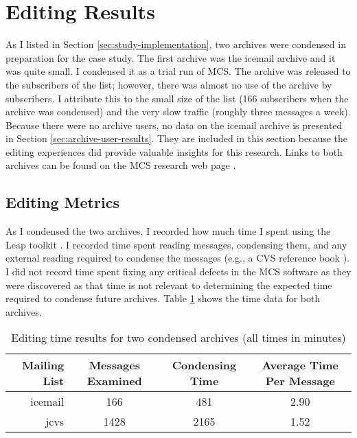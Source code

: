\section{Editing Results}
\label{sec:editing-results}
As I listed in Section \ref{sec:study-implementation}, two archives were
condensed in preparation for the case study. The first archive was the icemail
archive and it was quite small. I condensed it as a trial run of MCS.  The
archive was released to the subscribers of the list; however, there was almost
no use of the archive by subscribers. I attribute this to the small size of the
list (166 subscribers when the archive was condensed) and the very slow traffic
(roughly three messages a week). Because there were no archive users, no data
on the icemail archive is presented in Section \ref{sec:archive-user-results}.
They are included in this section because the editing experiences did provide
valuable insights for this research. Links to both archives can be found on the
MCS research web page \cite{mcs-website}.

\subsection{Editing Metrics}
\label{sec:editing-metrics}
As I condensed the two archives, I recorded how much time I spent using the
Leap toolkit \cite{csdl-99-08}. I recorded time spent reading messages,
condensing them, and any external reading required to condense the messages
(e.g., a CVS reference book \cite{cvs-redbean}). I did not record time spent
fixing any critical defects in the MCS software as they were discovered as that
time is not relevant to determining the expected time required to condense
future archives. Table \ref{tab:editing-time} shows the time data for both
archives.

\begin{table}[htbp]
  \begin{center}
    \caption{Editing time results for two condensed archives (all times in minutes)}
    \label{tab:editing-time}
    \begin{tabular} {|r|c|c|c|} \hline
      {\bf Mailing List} & {\bf Messages Examined} & {\bf Condensing Time} &
      {\bf Average Time Per Message}\\ \hline\hline
      icemail & 166 & 481 & 2.90\\ \hline
      jcvs & 1428 & 2165 & 1.52\\ \hline
    \end{tabular}
  \end{center}
\end{table}

